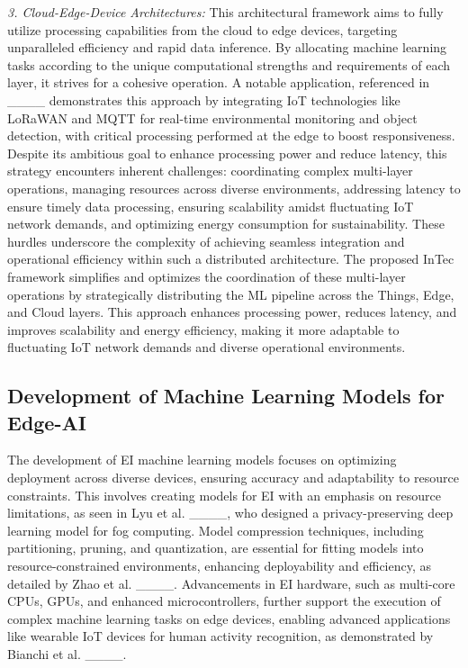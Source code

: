 	
	\textit{3. Cloud-Edge-Device Architectures:} This architectural framework aims to fully utilize processing capabilities from the cloud to edge devices, targeting unparalleled efficiency and rapid data inference. By allocating machine learning tasks according to the unique computational strengths and requirements of each layer, it strives for a cohesive operation. A notable application, referenced in ____ demonstrates this approach by integrating IoT technologies like LoRaWAN and MQTT for real-time environmental
	monitoring and object detection, with critical processing performed at the edge
	to boost responsiveness. Despite its ambitious goal to enhance processing power
	and reduce latency, this strategy encounters inherent challenges: coordinating
	complex multi-layer operations, managing resources across diverse environments,
	addressing latency to ensure timely data processing, ensuring scalability amidst
	fluctuating IoT network demands, and optimizing energy consumption for sustainability. These hurdles underscore the complexity of achieving seamless integration and operational efficiency within such a distributed architecture. The proposed InTec framework simplifies and optimizes
	the coordination of these multi-layer operations by strategically distributing the
	ML pipeline across the Things, Edge, and Cloud layers. This approach enhances
	processing power, reduces latency, and improves scalability and energy efficiency,
	making it more adaptable to fluctuating IoT network demands and diverse operational environments.
	
	\subsection{Development of Machine Learning Models for Edge-AI} 
	The development of EI machine learning models focuses on optimizing deployment across diverse devices, ensuring accuracy and adaptability to resource constraints. This involves creating models for EI with an emphasis on resource limitations, as seen in Lyu et al. ____, who designed a privacy-preserving deep learning model for fog computing. Model compression techniques, including partitioning, pruning, and quantization, are essential for fitting models into resource-constrained environments, enhancing deployability and efficiency, as detailed by Zhao et al. ____. Advancements in EI hardware, such as multi-core CPUs, GPUs, and enhanced microcontrollers, further support the execution of complex machine learning tasks on edge devices, enabling advanced applications like wearable IoT devices for human activity recognition, as demonstrated by Bianchi et al. ____.